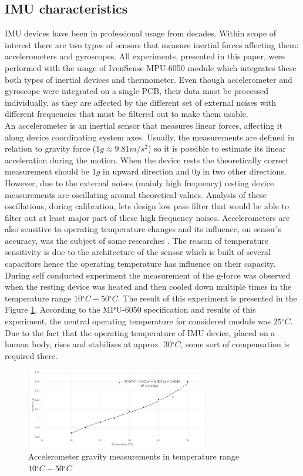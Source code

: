 \documentclass[sensors,article,submit,moreauthors,pdftex,10pt,a4paper]{mdpi}
\newcommand{\degree}{\ensuremath{{}^{\circ}}\xspace}
\begin{document}
\subsection{IMU characteristics}
IMU devices have been in professional usage from decades. Within scope of interest there are two types of sensors that measure inertial forces affecting them: accelerometers and gyroscopes. All experiments, presented in this paper, were performed with the usage of IvenSense MPU-6050 module which integrates these both types of inertial devices and thermometer. Even though accelerometer and gyroscope were integrated on a single PCB, their data must be processed individually, as they are affected by the different set of external noises with different frequencies that must be filtered out to make them usable.\\
An accelerometer is an inertial sensor that measures linear forces, affecting it along device coordinating system axes. Usually, the measurements are defined in relation to gravity force ($1g \approx 9.81  m/{s^2}$) so it is possible to estimate its linear acceleration during the motion. When the device rests the theoretically correct measurement should be $1g$ in upward direction and $0g$ in two other directions. However, due to the external noises (mainly high frequency) resting device measurements are oscillating around theoretical values. Analysis of these oscillations, during calibration, lets design low pass filter that would be able to filter out at least major part of these high frequency noises. Accelerometers are also sensitive to operating temperature changes and its influence, on sensor’s accuracy, was the subject of some researches \cite{Schneider2006, Grigorie1996}. The reason of temperature sensitivity is due to the architecture of the sensor which is built of several capacitors hence the operating temperature has influence on their capacity. During self conducted experiment the measurement of the g-force was observed when the resting device was heated and then cooled down multiple times in the temperature range $10\degree C - 50\degree C$. The result of this experiment is presented in the Figure \ref{fig:imu:tmep}.
According to the MPU-6050 specification and results of this experiment, the neutral operating temperature for considered module was $25\degree C$. Due to the fact that the operating temperature of IMU device, placed on a human body, rises and stabilizes at approx. $30 \degree C$, some sort of compensation is required there. 
\begin{figure}[H]
	\centering
	\includegraphics[width=8cm]{Figure6.png}
	\caption{Accelerometer gravity measurements in temperature range $10\degree C - 50\degree C$}
	\label{fig:imu:tmep}
\end{figure}
\end{document}
